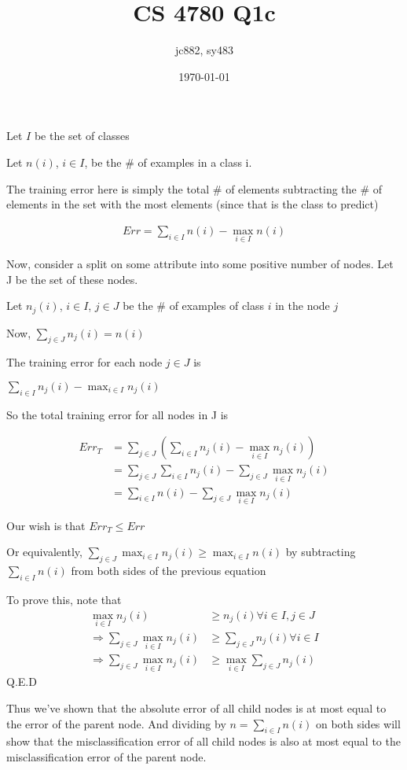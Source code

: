 \documentclass[]{article}
\begin{document}
\title{CS 4780 Q1c}
\author{jc882, sy483}
\date{\today}
\maketitle

Let $I$ be the set of classes

Let $n(i)$, $i \in I$, be the \# of examples in a class i.

The training error here is simply the total \# of elements subtracting the \# of elements in the set with the most elements (since that is the class to predict)

\begin{align*}
Err = \sum_{i \in I} n(i) - \max_{i \in I} n(i)
\end{align*}

Now, consider a split on some attribute into some positive number of nodes. Let J be the set of these nodes.

Let $n_j(i)$, $i \in I$, $j \in J$ be the \# of examples of class $i$ in the node $j$

Now, $\sum_{j \in J} n_j(i) = n(i)$

The training error for each node $j \in J$ is

$\sum_{i \in I} n_j(i) - \max_{i \in I} n_j(i)$

So the total training error for all nodes in J is

\begin{align*}
Err_T &= \sum_{j \in J} ( \sum_{i \in I} n_j(i) - \max_{i \in I} n_j(i) ) \\
&= \sum_{j \in J} \sum_{i \in I} n_j(i) - \sum_{j \in J} \max_{i \in I} n_j(i) \\
&= \sum_{i \in I} n(i) - \sum_{j \in J} \max_{i \in I} n_j(i)
\end{align*}

Our wish is that $Err_T \le Err$

Or equivalently, $\sum_{j \in J} \max_{i \in I} n_j(i) \ge \max_{i \in I} n(i)$ by subtracting $\sum_{i \in I} n(i)$ from both sides of the previous equation

To prove this, note that
\begin{align*}
\max_{i \in I} n_j(i) &\ge n_j(i) \forall i \in I, j \in J \\
\Rightarrow \sum_{j \in J} \max_{i \in I} n_j(i) &\ge \sum_{j \in J} n_j(i) \forall i \in I \\
\Rightarrow \sum_{j \in J} \max_{i \in I} n_j(i) &\ge \max_{i \in I} \sum_{j \in J} n_j(i)
\end{align*}
Q.E.D

Thus we've shown that the absolute error of all child nodes is at most equal to the error of the parent node. And dividing by $n = \sum_{i \in I} n(i)$ on both sides will show that the misclassification error of all child nodes is also at most equal to the misclassification error of the parent node.
\end{document}
